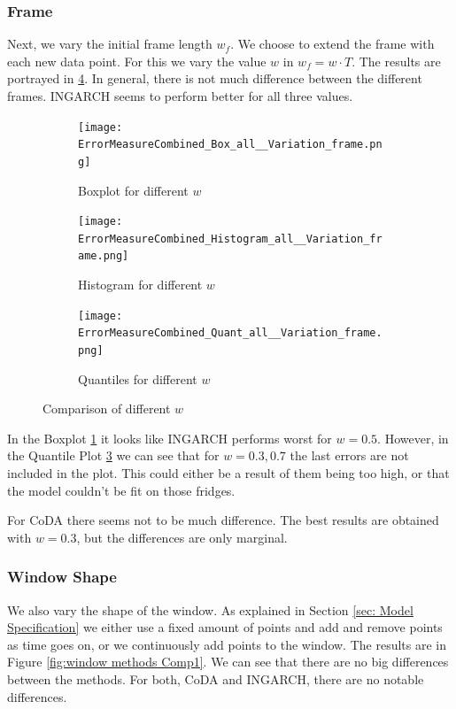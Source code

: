 \subsubsection{Frame}
\label{sec:Frame}

Next, we vary the initial frame length $w_f$. We choose to extend the frame with each new data point. For this we vary the value $w$ in $w_f=w\cdot T$. The results are portrayed in \ref{fig:Frame Comp1}. In general, there is not much difference between the different frames. INGARCH seems to perform better for all three values.
\begin{figure}[htb!]
\centering
\begin{subfigure}[b]{0.4\textwidth}
\texttt{[image: ErrorMeasureCombined\_Box\_all\_\_Variation\_frame.png]}
\caption{Boxplot for different $w$}
\label{fig:Frame Box}
\end{subfigure}
\hfill
\begin{subfigure}[b]{0.4\textwidth}
\texttt{[image: ErrorMeasureCombined\_Histogram\_all\_\_Variation\_frame.png]}
\caption{Histogram for different $w$}
\label{fig:Frame Hist}
\end{subfigure}
\hfill
\begin{subfigure}[b]{0.6\textwidth}
\texttt{[image: ErrorMeasureCombined\_Quant\_all\_\_Variation\_frame.png]}
\caption{Quantiles for different $w$}
\label{fig:Frame Quant}
\end{subfigure}
\caption{Comparison of different $w$}
\label{fig:Frame Comp1}
\end{figure}


In the Boxplot \ref{fig:Frame Box} it looks like INGARCH performs worst for $w=0.5$. However, in the Quantile Plot \ref{fig:Frame Quant} we can see that for $w=0.3,0.7$ the last errors are not included  in the plot. This could either be a result of them being too high, or that the model couldn't be fit on those fridges. 

For CoDA there seems not to be much difference. The best results are obtained with $w=0.3$, but the differences are only marginal. 


\subsubsection{Window Shape}
\label{sec:Window Shape}

We also vary the shape of the window. As explained in Section \ref{sec: Model Specification} we either use a fixed amount of points and add and remove points as time goes on, or we continuously add points to the window. The results are in Figure \ref{fig:window methods Comp1}. We can see that there are no big differences between the methods. For both, CoDA and INGARCH, there are no notable differences. 

